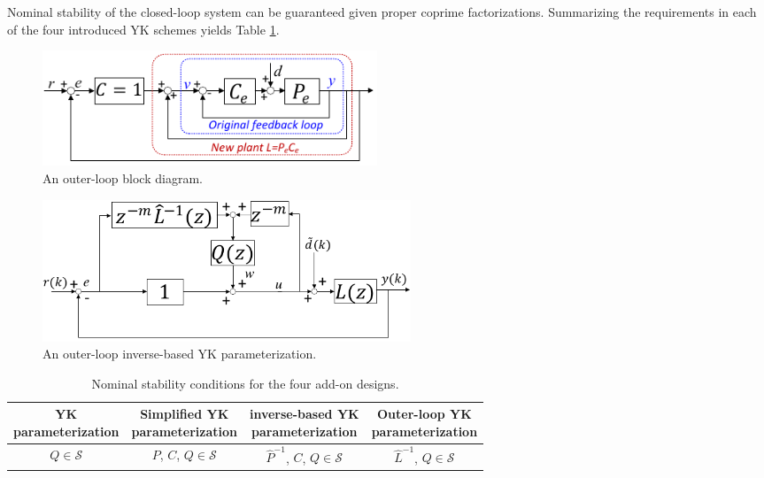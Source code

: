 \documentclass [11pt, proquest] {uwthesis}[2020/02/24]
\begin{document}
Nominal stability of the closed-loop system can be guaranteed given
proper coprime factorizations. Summarizing the requirements in each
of the four introduced YK schemes yields Table \ref{tab:Nominal-stability-conditions}.
\begin{figure}[!ht]
\begin{centering}
\includegraphics[width=10cm]{Loop-shaping/block diagram-BL}
\par\end{centering}
\caption{\label{fig:A-discrete-time-inverse-based-1-1}An outer-loop block
diagram.}
\end{figure}
\begin{figure}[!ht]
\begin{centering}
\includegraphics[width=11cm]{Loop-shaping/L-YK parameterization}
\par\end{centering}
\caption{\label{fig:A-outer-loop-inverse-based}An outer-loop inverse-based
YK parameterization.}
\end{figure}
\begin{table}[!ht]
\caption{\label{tab:Nominal-stability-conditions}Nominal stability conditions
for the four add-on designs.}
\begin{centering}
\setlength\tabcolsep{1.5pt}
\begin{tabular}{cccc} 

\toprule

\makecell{YK \\ parameterization} & \makecell{Simplified YK \\ parameterization} & \makecell{inverse-based YK \\ parameterization} & \makecell{Outer-loop YK \\ parameterization}\\

\midrule

$Q\in\mathcal{S}$ & $P$, $C$, $Q\in\mathcal{S}$ & $\hat{P}^{-1}$, $C$, $Q\in\mathcal{S}$ & $\hat{L}^{-1}$, $Q\in\mathcal{S}$\\

\bottomrule
\end{tabular}
\par\end{centering}
\end{table}
\end{document}
